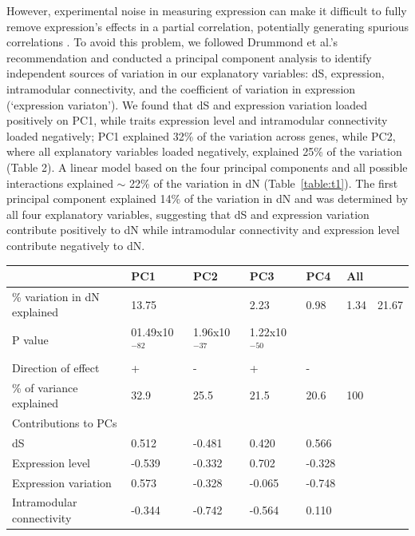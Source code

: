 However, experimental noise in measuring expression can make it difficult to fully remove expression’s effects in a partial correlation, potentially generating spurious correlations \citep{Drummond2006-pa}. To avoid this problem, we followed Drummond et al.’s recommendation and conducted a principal component analysis to identify independent sources of variation in our explanatory variables: dS, expression, intramodular connectivity, and the coefficient of variation in expression (‘expression variaton’). We found that dS and expression variation loaded positively  on PC1, while traits expression level and intramodular connectivity loaded negatively; PC1 explained 32\% of the variation across genes, while PC2, where all explanatory variables loaded negatively, explained 25\% of the variation (Table 2). A linear model based on the four principal components and all possible interactions explained $\sim$ 22\% of the variation in dN (Table~\ref{table:t1}). The first principal component explained 14\% of the variation in dN and was determined by all four explanatory variables, suggesting that dS and expression variation contribute positively to dN while intramodular connectivity and expression level contribute negatively to dN. 

\begin{table}[ht!]
\centering
\begin{tabular}{|l|l l l l l|}
\hline
 &PC1 &PC2 &PC3 &PC4 &All \\ [0.5ex]
\hline
\% variation in dN explained & 13.75 & &2.23 &0.98& 1.34 & 21.67\\
P value & 01.49x10$^{-82}$ & 1.96x10$^{-37}$ & 1.22x10$^{-50}$ &  \\
Direction of effect & + & - & + & - & \\
\% of variance explained & 32.9 &25.5 &21.5 &20.6 &100 & \\
\hline
Contributions to PCs & & & & & \\ [0.5ex]
dS & 0.512 & -0.481 & 0.420 & 0.566 & \\
Expression level & -0.539 &-0.332 &0.702 & -0.328 & \\
Expression variation &0.573 &-0.328 &-0.065 &-0.748 & \\
Intramodular connectivity &-0.344 &-0.742 &-0.564 &0.110 & \\
\hline
\end{tabular}
\label{table:t2}
\end{table}

